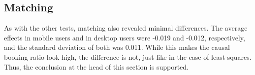 \documentclass{article}
\begin{document}
\subsection{Matching}

As with the other tests, matching also revealed minimal differences.  The
average effects in mobile users and in desktop users were -0.019 and -0.012,
respectively, and the standard deviation of both was 0.011.  While this makes
the causal booking ratio look high, the difference is not, just like in the case
of least-squares.  Thus, the conclusion at the head of this section is
supported.

\printbibliography
\end{document}
